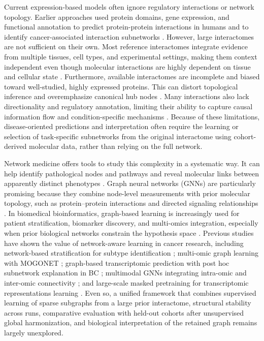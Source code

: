 \documentclass[unnumsec,webpdf,modern,large]{oup-authoring-template}
\begin{document}
Current expression-based models often ignore regulatory interactions or network topology. Earlier approaches used protein domains, gene expression, and functional annotation to predict protein-protein interactions in humans and to identify cancer-associated interaction subnetworks \citep{Rhodes2005}. However, large interactomes are not sufficient on their own. Most reference interactomes integrate evidence from multiple tissues, cell types, and experimental settings, making them context independent even though molecular interactions are highly dependent on tissue and cellular state \citep{Bossi2009,Magger2012,LamanTrip2025}. Furthermore, available interactomes are incomplete and biased toward well-studied, highly expressed proteins. This can distort topological inference and overemphasize canonical hub nodes \citep{deSilva2006,Gillis2014,Wright2024}. Many interactions also lack directionality and regulatory annotation, limiting their ability to capture causal information flow and condition-specific mechanisms \citep{Silverbush2019}. Because of these limitations, disease-oriented predictions and interpretation often require the learning or selection of task-specific subnetworks from the original interactome using cohort-derived molecular data, rather than relying on the full network.

Network medicine offers tools to study this complexity in a systematic way. It can help identify pathological nodes and pathways and reveal molecular links between apparently distinct phenotypes \citep{Barabasi2011NetworkMedicine}. Graph neural networks (GNNs) are particularly promising because they combine node-level measurements with prior molecular topology, such as protein--protein interactions and directed signaling relationships \citep{Gilmer2017MPNN,Velickovic2018GAT}. In biomedical bioinformatics, graph-based learning is increasingly used for patient stratification, biomarker discovery, and multi-omics integration, especially when prior biological networks constrain the hypothesis space \citep{Gogoshin2023GNNCancer}. Previous studies have shown the value of network-aware learning in cancer research, including network-based stratification for subtype identification \citep{Hofree2013NBS}; multi-omic graph learning with MOGONET \citep{Wang2021MOGONET}; graph-based transcriptomic prediction with post hoc subnetwork explanation in BC \citep{Chereda2021GLRP}; multimodal GNNs integrating intra-omic and inter-omic connectivity \citep{Li2024MultimodalGNN}; and large-scale masked pretraining for transcriptomic representations learning \citep{Theodoris2023Geneformer}. Even so, a unified framework that combines supervised learning of sparse subgraphs from a large prior interactome, structural stability across runs, comparative evaluation with held-out cohorts after unsupervised global harmonization, and biological interpretation of the retained graph remains largely unexplored.
\end{document}
